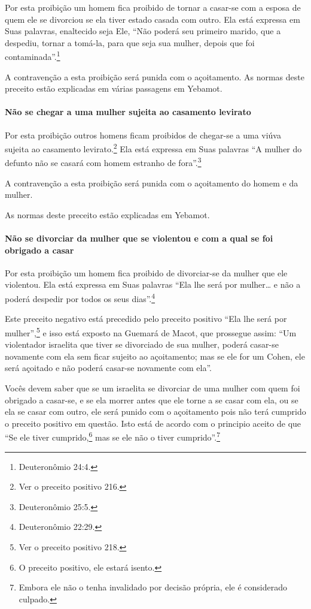 Por esta proibição um homem fica proibido de tornar a casar-se com a
esposa de quem ele se divorciou se ela tiver estado casada com outro.
Ela está expressa em Suas palavras, enaltecido seja Ele, ``Não poderá
seu primeiro marido, que a despediu, tornar a tomá-la, para que seja sua
mulher, depois que foi contaminada''.\footnote{Deuteronômio 24:4.}

A contravenção a esta proibição será punida com o açoitamento. As normas
deste preceito estão explicadas em várias passagens em Yebamot.

\paragraph{Não se chegar a uma mulher sujeita ao casamento levirato}

Por esta proibição outros homens ficam proibidos de chegar-se a uma
viúva sujeita ao casamento levirato.\footnote{Ver o preceito positivo 216.} Ela está
expressa em Suas palavras ``A mulher do defunto não se casará com homem
estranho de fora''.\footnote{Deuteronômio 25:5.}

A contravenção a esta proibição será punida com o açoitamento do homem e
da mulher.

As normas deste preceito estão explicadas em Yebamot.

\paragraph{Não se divorciar da mulher que se violentou e com a qual se foi obrigado a casar}

Por esta proibição um homem fica proibido de divorciar-se da mulher que
ele violentou. Ela está expressa em Suas palavras ``Ela lhe será por
mulher\ldots{} e não a poderá despedir por todos os seus dias''.\footnote{Deuteronômio 22:29.}

Este preceito negativo está precedido pelo preceito positivo ``Ela lhe
será por mulher'',\footnote{Ver o preceito positivo 218.} e isso está exposto na Guemará
de Macot, que prossegue assim: ``Um violentador israelita que tiver se
divorciado de sua mulher, poderá casar-se novamente com ela sem ficar
sujeito ao açoitamento; mas se ele for um Cohen, ele será açoitado e
não poderá casar-se novamente com ela''.

Vocês devem saber que se um israelita se divorciar de uma mulher com
quem foi obrigado a casar-se, e se ela morrer antes que ele torne a se
casar com ela, ou se ela se casar com outro, ele será punido com o
açoitamento pois não terá cumprido o preceito positivo em questão. Isto
está de acordo com o principio aceito de que ``Se ele tiver
cumprido,\footnote{O preceito positivo, ele estará isento.} mas se ele não o tiver
cumprido''.\footnote{Embora ele não o tenha invalidado por decisão própria, ele é
  considerado culpado.}

